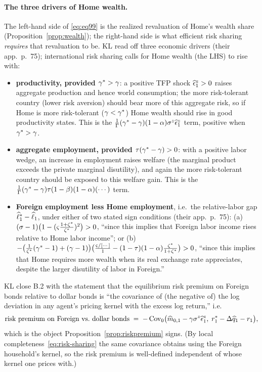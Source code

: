 \paragraph{The three drivers of Home wealth.} The left-hand side of
\eqref{eq:eq99} is the realized revaluation of Home's wealth share
(Proposition~\ref{prop:wealth}); the right-hand side is what efficient risk
sharing \emph{requires} that revaluation to be. KL read off three economic
drivers (their app.~p.~75); international risk sharing calls for Home wealth (the
LHS) to rise with:
\begin{itemize}[leftmargin=1.6em,itemsep=3pt]
  \item \textbf{productivity, provided $\gamma^{*}>\gamma$}: a positive TFP shock
  $\widehat{\epsilon}^z_1>0$ raises aggregate production and hence world consumption;
  the more risk-tolerant country (lower risk aversion) should bear more of this
  aggregate risk, so if Home is more risk-tolerant ($\gamma<\gamma^{*}$) Home wealth
  should rise in good productivity states. This is the
  $\frac{1}{\Gamma}(\gamma^{*}-\gamma)(1-\alpha)\sigma^z\widehat{\epsilon}^z_1$ term, positive
  when $\gamma^{*}>\gamma$.
  \item \textbf{aggregate employment, provided $\tau(\gamma^{*}-\gamma)>0$}: with a
  positive labor wedge, an increase in employment raises welfare (the marginal
  product exceeds the private marginal disutility), and again the more
  risk-tolerant country should be exposed to this welfare gain. This is the
  $\frac{1}{\Gamma}(\gamma^{*}-\gamma)\tau(1-\beta)(1-\alpha)(\cdots)$ term.
  \item \textbf{Foreign employment less Home employment}, i.e.\ the relative-labor
  gap $\widehat{\ell}^{*}_1-\widehat{\ell}_1$, under either of two stated sign
  conditions (their app.~p.~75): (a)
  $(\sigma-1)\bigl(1-(\varsigma\frac{1+\zeta^{*}}{\zeta^{*}})^2\bigr)>0$, ``since this implies that
  Foreign labor income rises relative to Home labor income''; or (b)
  $-\bigl(\frac{1}{\zeta^{*}}(\gamma^{*}-1)+(\gamma-1)\bigr)\bigl(\frac{\varsigma/[\cdots]}{1}-(1-\tau)(1-\alpha)\frac{\zeta^{*}}{1+\zeta^{*}}\bigr)>0$,
  ``since this implies that Home requires more wealth when its real exchange rate
  appreciates, despite the larger disutility of labor in Foreign.''
\end{itemize}
KL close B.2 with the statement that the equilibrium risk premium on Foreign
bonds relative to dollar bonds is ``the covariance of (the negative of) the log
deviation in any agent's pricing kernel with the excess log return,'' i.e.\
\begin{equation}
\text{risk premium on Foreign vs.\ dollar bonds}
\;=\; -\operatorname{Cov}_0\bigl(\widehat{m}_{0,1}-\gamma\sigma^z\widehat{\epsilon}^z_1,\;r^{*}_1-\Delta\widehat{q}_1-r_1\bigr), \label{eq:rp-cov}
\end{equation}
which is the object Proposition~\ref{prop:riskpremium} signs. (By local
completeness~\eqref{eq:risk-sharing} the same covariance obtains using the
Foreign household's kernel, so the risk premium is well-defined independent of
whose kernel one prices with.)

